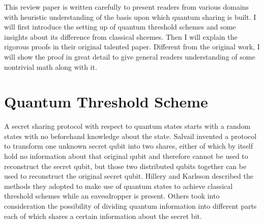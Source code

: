 \documentclass[12pt]{article}
\begin{document}
	This review paper is written carefully to present readers from various domains with heuristic understanding of the basis upon which quantum sharing is built. I will first introduce the setting up of quantum threshold schemes and some insights about its difference from classical shcemes. Then I will explain the rigorous proofs in their original talented paper. Different from the original work, I will show the proof in great detail to give general readers understanding of some nontrivial math along with it.\\
	
\section{Quantum Threshold Scheme}
    A secret sharing protocol with respect to quantum states starts with a random states with no beforehand knowledge about the state. 
	Salvail\cite{Salvail} invented a protocol to transform one unknown secret qubit into two shares, either of which by itself hold no information about that original qubit and therefore cannot be used to reconstruct the secret qubit, 
	but those two distributed qubits together can be used to reconstruct the original secret qubit.
	Hillery\cite{Hillery} and Karlsson\cite{Karlsson} described the methods they adopted to make use of quantum states to achieve classical threshold schemes while an eavesdropper is present. Others took into consideration the possibility of dividing quantum information into different parts each of which shares a certain information about the secret bit.
\end{document}
